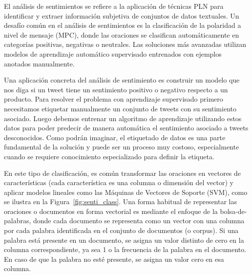 El análisis de sentimientos se refiere a la aplicación de técnicas PLN para identificar y extraer información subjetiva de conjuntos de datos textuales. Un desafío común en el análisis de sentimientos es la clasificación de la polaridad a nivel de mensaje (MPC), donde las oraciones se clasifican automáticamente en categorías positivas, negativas o neutrales. Las soluciones más avanzadas utilizan modelos de aprendizaje automático supervisado entrenados con ejemplos anotados manualmente.

Una aplicación concreta del análisis de sentimiento es construir un modelo que nos diga si un tweet tiene un sentimiento positivo o negativo respecto a un producto. Para resolver el problema con aprendizaje supervisado primero necesitamos etiquetar manualmente un conjunto de tweets con su sentimiento asociado. Luego debemos entrenar un algoritmo de aprendizaje utilizando estos datos para poder predecir de manera automática el sentimiento asociado a tweets desconocidos. Como podrán imaginar, el etiquetado de datos es una parte fundamental de la solución y puede ser un proceso muy costoso, especialmente cuando se requiere conocimiento especializado para definir la etiqueta.

En este tipo de clasificación, es común transformar las oraciones en vectores de características (cada característica es una columna o dimensión del vector) y aplicar modelos lineales como las Máquinas de Vectores de Soporte (SVM), como se ilustra en la Figura~\ref{fig:senti_class}. Una forma habitual de representar las oraciones o documentos en forma vectorial es mediante el enfoque de la bolsa-de-palabras, donde cada documento se representa como un vector con una columna por cada palabra identificada en el conjunto de documentos (o corpus). Si una palabra está presente en un documento, se asigna un valor distinto de cero en la columna correspondiente, ya sea 1 o la frecuencia de la palabra en el documento. En caso de que la palabra no esté presente, se asigna un valor cero en esa columna.

